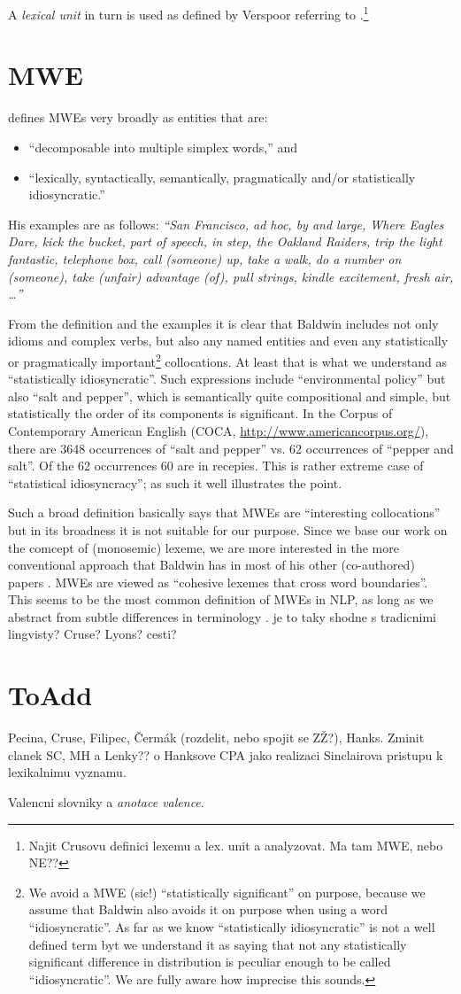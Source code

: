 A \emph{lexical unit} in turn is used as defined by Verspoor referring to \citet{cruse:1986}.\footnote%
{\xxx Najit Crusovu definici lexemu a lex. unit a analyzovat. Ma tam MWE, nebo NE??} 

\section{MWE}

\citet{baldwin:2004} defines MWEs very broadly as entities that are:
\begin{itemize}
\item
``decomposable into multiple simplex words,'' and
\item
``lexically, syntactically, semantically, pragmatically and/or statistically idiosyncratic.''
\end{itemize}

His examples are as follows: \emph{``San Francisco, ad hoc, by and large, Where Eagles Dare, kick the bucket, part of speech, in step, the Oakland Raiders, trip the light fantastic, telephone box, call (someone) up, take a walk, do a number on (someone), take (unfair) advantage (of), pull strings, kindle excitement, fresh air, \ldots''}

From the definition and the examples it is clear that Baldwin includes not only idioms and complex verbs, but also any named entities and even any statistically or pragmatically important\footnote{We avoid a MWE (sic!) ``statistically significant'' on purpose, because we assume that Baldwin also avoids it on purpose when using a word ``idiosyncratic''. As far as we know ``statistically idiosyncratic'' is not a well defined term byt we understand it as saying that not any statistically significant difference in distribution is peculiar enough to be called ``idiosyncratic''. We are fully aware how imprecise this sounds.} collocations. At least that is what we understand as ``statistically idiosyncratic''. Such expressions include ``environmental policy'' but also ``salt and pepper'', which is semantically quite compositional and simple, but statistically the order of its components is significant. In the Corpus of Contemporary American English (COCA, \url{http://www.americancorpus.org/}), there are 3648 occurrences of ``salt and pepper'' vs. 62 occurrences of ``pepper and salt''. Of the 62 occurrences 60 are in recepies. This is rather extreme case of ``statistical idiosyncracy''; as such it well illustrates the point.

Such a broad definition basically says that MWEs are ``interesting collocations'' but in its broadness it is not suitable for our purpose. Since we base our work on the comcept of (monosemic) lexeme, we are more interested in the more conventional approach that Baldwin has in most of his other (co-authored) papers \citep{baldwin:2003,sag:2002}. MWEs are viewed as ``cohesive lexemes that cross word boundaries''. This seems to be the most common definition of MWEs in NLP, as long as we abstract from subtle differences in terminology \citep{calzolari, copestake, dalsi?}. {\xxx je to taky shodne s tradicnimi lingvisty? Cruse? Lyons? cesti?}


\section{ToAdd}
Pecina, Cruse, Filipec, Čermák (rozdelit, nebo spojit se ZŽ?), Hanks. Zminit clanek SC, MH a Lenky?? o Hanksove CPA jako realizaci Sinclairova pristupu k lexikalnimu vyznamu.

Valencni slovniky a \emph{anotace valence}.